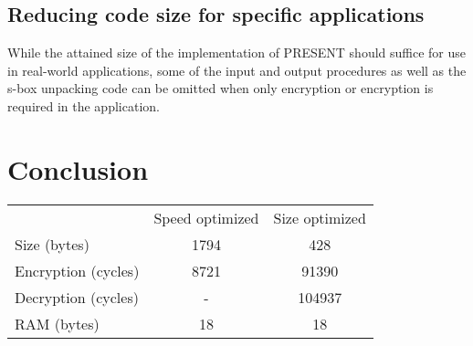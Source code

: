 \documentclass{article}
\begin{document}
\subsection{Reducing code size for specific applications}
While the attained size of the implementation of PRESENT should suffice for use in real-world applications, some of the input and output procedures as well as the s-box unpacking code can be omitted when only encryption or encryption is required in the application.

\section{Conclusion}
	\begin{tabular}{ l c c }
                & Speed optimized & Size optimized \\
        Size (bytes) & 1794 & 428 \\
        Encryption (cycles) & 8721 & 91390 \\
        Decryption (cycles) & - & 104937 \\
        RAM (bytes) & 18 & 18

	\end{tabular}
\end{document}
